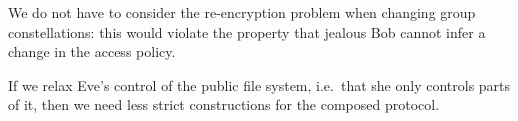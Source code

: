 We do not have to consider the re-encryption problem when changing group 
constellations: this would violate the property that jealous Bob cannot infer 
a change in the access policy.

If we relax Eve's control of the public file system, i.e.\ that she only 
controls parts of it, then we need less strict constructions for the composed 
protocol.

%
%
%
%
%
